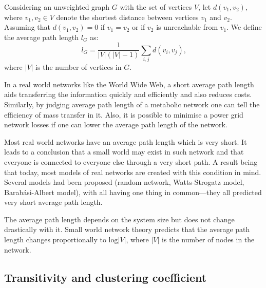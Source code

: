       Considering an unweighted graph $G$ with the set of vertices $V$, let $d(v_1, v_2)$, where $v_1, v_2 \in V$ denote the shortest distance between vertices $v_1$ and $v_2$. Assuming that $d(v_1, v_2) = 0$ if $v_1 = v_2$ or if $v_2$ is unreachable from $v_1$. We define the average path length $l_G$ as:
      \begin{equation}
        l_G = \frac{1}{|V| (|V| - 1)} \sum_{i, j} d(v_i, v_j) \mbox{,}
      \end{equation}
      where $|V|$ is the number of vertices in $G$.
      
      In a real world networks like the World Wide Web, a short average path length aids transferring the information quickly and efficiently and also reduces costs. Similarly, by judging average path length of a metabolic network one can tell the efficiency of mass transfer in it. Also, it is possible to minimise a power grid network losses if one can lower the average path length of the network.

      Most real world networks have an average path length which is very short. It leads to a conclusion that a small world may exist in such network and that everyone is connected to everyone else through a very short path. A result being that today, most models of real networks are created with this condition in mind. Several models had been proposed (random network, Watts-Strogatz model, Barabási-Albert model), with all having one thing in common---they all predicted very short average path length\cite{BarabasiAlbert2002}.

      The average path length depends on the system size but does not change drastically with it. Small world network theory predicts that the average path length changes proportionally to $\mbox{log} |V|$, where $|V|$ is the number of nodes in the network.

    \subsection{Transitivity and clustering coefficient}

